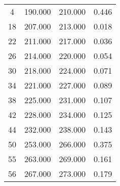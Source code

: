 % 
\begin{tabular}{cccc}
  \hline
  \hline
4 & 190.000 & 210.000 & 0.446 \\ 
  18 & 207.000 & 213.000 & 0.018 \\ 
  22 & 211.000 & 217.000 & 0.036 \\ 
  26 & 214.000 & 220.000 & 0.054 \\ 
  30 & 218.000 & 224.000 & 0.071 \\ 
  34 & 221.000 & 227.000 & 0.089 \\ 
  38 & 225.000 & 231.000 & 0.107 \\ 
  42 & 228.000 & 234.000 & 0.125 \\ 
  44 & 232.000 & 238.000 & 0.143 \\ 
  50 & 253.000 & 266.000 & 0.375 \\ 
  55 & 263.000 & 269.000 & 0.161 \\ 
  56 & 267.000 & 273.000 & 0.179 \\ 
   \hline
\end{tabular}
